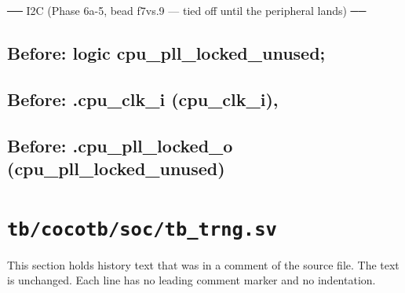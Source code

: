 \begin{record}
\begin{textblock}
── I2C (Phase 6a-5, bead f7vs.9 — tied off until the peripheral lands) ──
\end{textblock}

\subsection*{Before: logic cpu\_pll\_locked\_unused;}


\subsection*{Before: .cpu\_clk\_i      (cpu\_clk\_i),}


\subsection*{Before: .cpu\_pll\_locked\_o (cpu\_pll\_locked\_unused)}


\end{record}

\section{\texttt{tb/cocotb/soc/tb\_trng.sv}}\label{cr:suite:soc-tb-trng-sv}

This section holds history text that was in a comment of the source file. The text is unchanged. Each line has no leading comment marker and no indentation.

